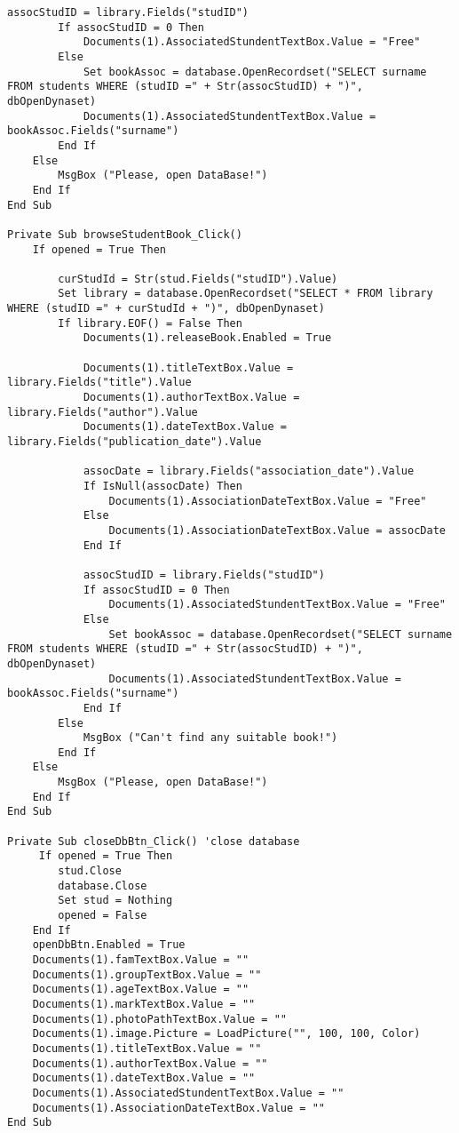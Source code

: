 \begin{lstlisting}[caption=VBA code]
        assocStudID = library.Fields("studID")
        If assocStudID = 0 Then
            Documents(1).AssociatedStundentTextBox.Value = "Free"
        Else
            Set bookAssoc = database.OpenRecordset("SELECT surname FROM students WHERE (studID =" + Str(assocStudID) + ")", dbOpenDynaset)
            Documents(1).AssociatedStundentTextBox.Value = bookAssoc.Fields("surname")
        End If
    Else
        MsgBox ("Please, open DataBase!")
    End If
End Sub

Private Sub browseStudentBook_Click()
    If opened = True Then
        
        curStudId = Str(stud.Fields("studID").Value)
        Set library = database.OpenRecordset("SELECT * FROM library WHERE (studID =" + curStudId + ")", dbOpenDynaset)
        If library.EOF() = False Then
            Documents(1).releaseBook.Enabled = True
            
            Documents(1).titleTextBox.Value = library.Fields("title").Value
            Documents(1).authorTextBox.Value = library.Fields("author").Value
            Documents(1).dateTextBox.Value = library.Fields("publication_date").Value
            
            assocDate = library.Fields("association_date").Value
            If IsNull(assocDate) Then
                Documents(1).AssociationDateTextBox.Value = "Free"
            Else
                Documents(1).AssociationDateTextBox.Value = assocDate
            End If
            
            assocStudID = library.Fields("studID")
            If assocStudID = 0 Then
                Documents(1).AssociatedStundentTextBox.Value = "Free"
            Else
                Set bookAssoc = database.OpenRecordset("SELECT surname FROM students WHERE (studID =" + Str(assocStudID) + ")", dbOpenDynaset)
                Documents(1).AssociatedStundentTextBox.Value = bookAssoc.Fields("surname")
            End If
        Else
            MsgBox ("Can't find any suitable book!")
        End If
    Else
        MsgBox ("Please, open DataBase!")
    End If
End Sub

Private Sub closeDbBtn_Click() 'close database
     If opened = True Then
        stud.Close
        database.Close
        Set stud = Nothing
        opened = False
    End If
    openDbBtn.Enabled = True
    Documents(1).famTextBox.Value = ""
    Documents(1).groupTextBox.Value = ""
    Documents(1).ageTextBox.Value = ""
    Documents(1).markTextBox.Value = ""
    Documents(1).photoPathTextBox.Value = ""
    Documents(1).image.Picture = LoadPicture("", 100, 100, Color)
    Documents(1).titleTextBox.Value = ""
    Documents(1).authorTextBox.Value = ""
    Documents(1).dateTextBox.Value = ""
    Documents(1).AssociatedStundentTextBox.Value = ""
    Documents(1).AssociationDateTextBox.Value = ""
End Sub


\end{lstlisting}
